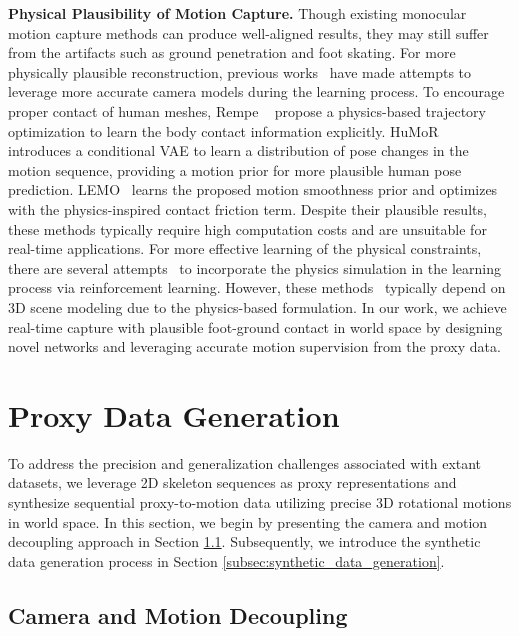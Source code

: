 \documentclass[10pt,twocolumn,letterpaper]{article}
\begin{document}
\textbf{Physical Plausibility of Motion Capture.} Though existing monocular motion capture methods can produce well-aligned results, they may still suffer from the artifacts such as ground penetration and foot skating.
For more physically plausible reconstruction, previous works~\cite{kocabas2021spec,yuan2021glamr} have made attempts to leverage more accurate camera models during the learning process.
To encourage proper contact of human meshes, Rempe \etal~\cite{rempe2020contact} propose a physics-based trajectory optimization to learn the body contact information explicitly.
HuMoR~\cite{rempe2021humor} introduces a conditional VAE to learn a distribution of pose changes in the motion sequence, providing a motion prior for more plausible human pose prediction.
LEMO~\cite{zhang2021learning} learns the proposed motion smoothness prior and optimizes with the physics-inspired contact friction term.
Despite their plausible results, these methods typically require high computation costs and are unsuitable for real-time applications.
For more effective learning of the physical constraints, there are several attempts~\cite{yuan2021simpoe,luo2022embodied} to incorporate the physics simulation in the learning process via reinforcement learning.
However, these methods~\cite{yuan2021simpoe,luo2022embodied} typically depend on 3D scene modeling due to the physics-based formulation.
In our work, we achieve real-time capture with plausible foot-ground contact in world space by designing novel networks and leveraging accurate motion supervision from the proxy data.






 \section{Proxy Data Generation}
To address the precision and generalization challenges associated with extant datasets, we leverage 2D skeleton sequences as proxy representations and synthesize sequential proxy-to-motion data utilizing precise 3D rotational motions in world space. In this section, we begin by presenting the camera and motion decoupling approach in Section \ref{subsec:cam_decouple}. Subsequently, we introduce the synthetic data generation process in Section \ref{subsec:synthetic_data_generation}.







\subsection{Camera and Motion Decoupling}
\label{subsec:cam_decouple}
\end{document}
